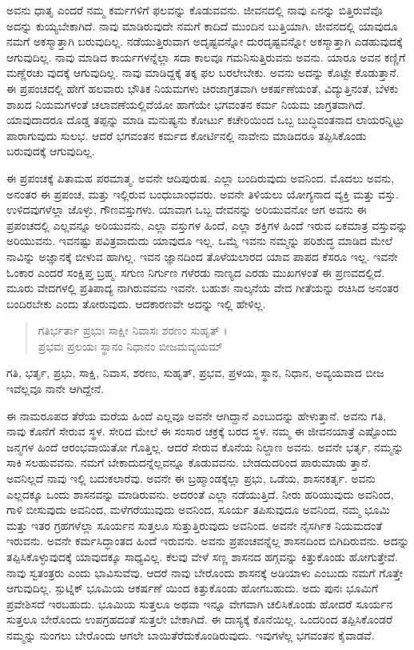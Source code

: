 ಅವನು ಧಾತೃ ಎಂದರೆ ನಮ್ಮ ಕರ್ಮಗಳಿಗೆ ಫಲವನ್ನು ಕೊಡುವವನು. ಜೀವನದಲ್ಲಿ ನಾವು ಏನನ್ನು ಬಿತ್ತಿರುವೆವೊ ಅದನ್ನು ಕುಯ್ಯಬೇಕಾಗಿದೆ. ನಾವು ಮಾಡಿರುವುದೇ ನಮಗೆ ಕಾದಿದೆ ಮುಂದಿನ ಬುತ್ತಿಯಾಗಿ. ಜೀವನದಲ್ಲಿ ಯಾವುದೂ ನಮಗೆ ಅಕಸ್ಮಾತ್ತಾಗಿ ಬರುವುದಿಲ್ಲ. ನಡೆಯುತ್ತಿರುವಾಗ ಅದೃಷ್ಟವನ್ನೋ ದುರದೃಷ್ಟವನ್ನೋ ಅಕಸ್ಮಾತ್ತಾಗಿ ಎಡಹುವುದಕ್ಕೆ ಆಗುವುದಿಲ್ಲ. ನಾವು ಮಾಡಿದ ಕಾರ್ಯಗಳನ್ನೆಲ್ಲಾ ಸದಾ ಕಾಲವೂ ಗಮನಿಸುತ್ತಿರುವನು ಅವನು. ಯಾರೂ ಅವನ ಕಣ್ಣಿಗೆ ಮಣ್ಣೆರಚು ವುದಕ್ಕೆ ಆಗುವುದಿಲ್ಲ. ನಾವು ಮಾಡಿದ್ದಕ್ಕೆ ತಕ್ಕ ಫಲ ಬರಲೇಬೇಕು. ಅವನು ಅದನ್ನು ಕೊಟ್ಟೇ ಕೊಡುತ್ತಾನೆ. ಈ ಪ್ರಪಂಚದಲ್ಲಿ ಹೇಗೆ ಹಲವಾರು ಭೌತಿಕ ನಿಯಮಗಳು ಚಿರಜಾಗ್ರತವಾಗಿ ಆಕರ್ಷಣೆಯಂತೆ, ವಿದ್ಯುತ್ತಿನಂತೆ, ಬೆಳಕು ಶಾಖದ ನಿಯಮಗಳಂತೆ ಚಲಾವಣೆಯಲ್ಲಿವೆಯೋ ಹಾಗೆಯೇ ಭಗವಂತನ ಕರ್ಮ ನಿಯಮ ಜಾಗ್ರತವಾಗಿದೆ. ಯಾವುದಾದರೂ ದೊಡ್ಡ ತಪ್ಪನ್ನು ಮಾಡಿ ಮನುಷ್ಯನು ಕೋರ್ಟು ಕಚೇರಿಯಿಂದ ಒಬ್ಬ ಬುದ್ಧಿವಂತನಾದ ಲಾಯರನ್ನಿಟ್ಟು ಪಾರಾಗುವುದು ಸುಲಭ. ಆದರೆ ಭಗವಂತನ ಕರ್ಮದ ಕೋರ್ಟಿನಲ್ಲಿ ನಾವೇನು ಮಾಡಿದರೂ ತಪ್ಪಿಸಿಕೊಂಡು ಬರುವುದಕ್ಕೆ ಆಗುವುದಿಲ್ಲ.

ಈ ಪ್ರಪಂಚಕ್ಕೆ ಪಿತಾಮಹ ಪರಮಾತ್ಮ. ಅವನೇ ಆದಿಪುರುಷ. ಎಲ್ಲಾ ಬಂದಿರುವುದು ಅವನಿಂದ. ಮೊದಲು ಅವನು, ಅನಂತರ ಈ ಪ್ರಪಂಚ, ಮತ್ತು ಇಲ್ಲಿರುವ ಬಂಧುಬಾಂಧವರು. ಅವನೇ ತಿಳಿಯಲು ಯೋಗ್ಯನಾದ ವ್ಯಕ್ತಿ ಮತ್ತು ವಸ್ತು. ಉಳಿದವುಗಳೆಲ್ಲಾ ಜೊಳ್ಳು, ಗೌಣವಸ್ತುಗಳು. ಯಾವಾಗ ಒಬ್ಬ ದೇವನನ್ನು ಅರಿಯುವನೋ ಆಗ ಅವನು ಈ ಪ್ರಪಂಚದಲ್ಲಿ ಎಲ್ಲವನ್ನೂ ಅರಿಯುವನು, ಎಲ್ಲಾ ವಸ್ತುಗಳ ಹಿಂದೆ, ಎಲ್ಲಾ ಶಕ್ತಿಗಳ ಹಿಂದೆ ಇರುವ ಏಕಮಾತ್ರ ವಸ್ತುವನ್ನು ಅರಿಯುವನು. ಇವನಷ್ಟು ಪವಿತ್ರವಾದುದು ಯಾವುದೂ ಇಲ್ಲ. ಒಮ್ಮೆ ಇವನು ನಮ್ಮನ್ನು ಪರಿಶುದ್ಧ ಮಾಡಿದ ಮೇಲೆ ನಾವಿನ್ನು ಅಜ್ಞಾನಕ್ಕೆ ಬೀಳುವ ಹಾಗಿಲ್ಲ. ಇವನ ಜ್ಞಾನದಿಂದ ತೊಳೆಯಲಾರದ ಯಾವ ಪಾಪದ ಕೆಸರೂ ಇಲ್ಲ. ಇವನೇ ಓಂಕಾರ ಎಂದರೆ ಸಂಕ್ಷಿಪ್ತ ಬ್ರಹ್ಮ. ಸಗುಣ ನಿರ್ಗುಣ ಗಳೆರಡು ನಾಣ್ಯದ ಎರಡು ಮುಖಗಳಂತೆ ಈ ಪ್ರಣವದಲ್ಲಿದೆ. ಮೂರು ವೇದಗಳಲ್ಲಿ ಪ್ರತಿಪಾದ್ಯ ನಾಗಿರುವವನು ಇವನೇ. ಬಹುಶಃ ನಾಲ್ಕನೆಯ ವೇದ ಗೀತೆಯನ್ನು ರಚಿಸಿದ ಅನಂತರ ಬಂದಿರಬೇಕು ಎಂದು ತೋರುವುದು. ಆದಕಾರಣವೇ ಅದನ್ನು ಇಲ್ಲಿ ಹೇಳಿಲ್ಲ.

\begin{verse}
ಗತಿರ್ಭರ್ತಾ ಪ್ರಭುಃ ಸಾಕ್ಷೀ ನಿವಾಸಃ ಶರಣಂ ಸುಹೃತ್ ।\\ಪ್ರಭವಃ ಪ್ರಲಯಃ ಸ್ಥಾನಂ ನಿಧಾನಂ ಬೀಜಮವ್ಯಯಮ್ 
\end{verse}

{\small ಗತಿ, ಭರ್ತೃ, ಪ್ರಭು, ಸಾಕ್ಷಿ, ನಿವಾಸ, ಶರಣು, ಸುಹೃತ್, ಪ್ರಭವ, ಪ್ರಳಯ, ಸ್ಥಾನ, ನಿಧಾನ, ಅವ್ಯಯವಾದ ಬೀಜ ಇವೆಲ್ಲವೂ ನಾನೇ ಆಗಿದ್ದೇನೆ.}

ಈ ನಾಮರೂಪದ ತೆರೆಯ ಮರೆಯ ಹಿಂದೆ ಎಲ್ಲವೂ ಅವನೇ ಆಗಿದ್ದಾನೆ ಎಂಬುದನ್ನು ಹೇಳುತ್ತಾನೆ. ಅವನು ಗತಿ, ನಾವು ಕೊನೆಗೆ ಸೇರುವ ಸ್ಥಳ. ಸೇರಿದ ಮೇಲೆ ಈ ಸಂಸಾರ ಚಕ್ರಕ್ಕೆ ಬರದ ಸ್ಥಳ. ನಮ್ಮ ಈ ಜೀವನಯಾತ್ರೆ ಎಷ್ಟೊಂದು ಜನ್ಮಗಳ ಹಿಂದೆ ಆರಂಭವಾಯಿತೋ ಗೊತ್ತಿಲ್ಲ. ಆದರೆ ಸೇರುವ ಕೊನೆಯ ನಿಲ್ದಾಣ ಅವನು. ಅವನೇ ಭರ್ತೃ, ನಮ್ಮನ್ನು ಸಾಕಿ ಸಲಹುವವನು. ನಮಗೆ ಬೇಕಾದುದನ್ನೆಲ್ಲವನ್ನೂ ಕೊಡುವವನು. ಬೇಡದುದರಿಂದ ಪಾರುಮಾಡು ತ್ತಾನೆ. ಅವನಿಲ್ಲದೆ ನಾವು ಇಲ್ಲಿ ಬದುಕಲಾರೆವು. ಅವನೇ ಈ ಬ್ರಹ್ಮಾಂಡಕ್ಕೆಲ್ಲಾ ಪ್ರಭು, ಒಡೆಯ, ಶಾಸನಕರ್ತೃ. ಅವನು ಎಲ್ಲದಕ್ಕೂ ಒಂದು ಶಾಸನವನ್ನು ಮಾಡಿರುವನು. ಅದರಂತೆ ಎಲ್ಲಾ ನಡೆಯುತ್ತಿದೆ. ನೀರು ಹರಿಯುವುದು ಅವನಿಂದ, ಗಾಳಿ ಬೀಸುವುದು ಅವನಿಂದ, ಮಳೆಗರೆಯುವುದು ಅವನಿಂದ, ಸೂರ್ಯ ತಪಿಸುವುದೂ ಅವನಿಂದ, ನಮ್ಮ ಭೂಮಿ ಮತ್ತು ಇತರ ಗ್ರಹಗಳೆಲ್ಲಾ ಸೂರ್ಯನ ಸುತ್ತಲೂ ಸುತ್ತುತ್ತಿರುವುದು ಅವನಿಂದ. ಅವನೇ ನೈಸರ್ಗಿಕ ನಿಯಮದಂತೆ ಇರುವನು. ಅವನೇ ಕರ್ಮಸಿದ್ಧಾಂತದ ಹಿಂದೆ ಇರುವನು. ಅವನು ಪ್ರಪಂಚವನ್ನೆಲ್ಲ ಶಾಸನದಿಂದ ಬಿಗಿದಿರುವನು. ಅದನ್ನು ತಪ್ಪಿಸಿಕೊಳ್ಳುವುದಕ್ಕೆ ಯಾವುದಕ್ಕೂ ಸಾಧ್ಯವಿಲ್ಲ. ಕೆಲವು ವೇಳೆ ಸಣ್ಣ ಶಾಸನದ ಹಗ್ಗವನ್ನು ಕಿತ್ತುಕೊಂಡು ಹೋಗುತ್ತೇವೆ. ನಾವು ಸ್ವತಂತ್ರರು ಎಂದು ಭಾವಿಸುವೆವು. ಆದರೆ ನಾವು ಬೇರೊಂದು ಶಾಸನಕ್ಕೆ ಅಡಿಯಾಳು ಎಂಬುದು ನಮಗೆ ಗೊತ್ತೇ ಆಗುವುದಿಲ್ಲ. ಸ್ಪುಟ್ನಿಕ್ ಭೂಮಿಯ ಆಕರ್ಷಣೆ ಯಿಂದ ಕಿತ್ತುಕೊಂಡು ಹೋಗಬಹುದು. ಅದು ಪುನಃ ಭೂಮಿಗೆ ಪ್ರವೇಶಿಸದೆ ಇರಬಹುದು. ಭೂಮಿಯ ಸುತ್ತಲೂ ಅಥವಾ ಇನ್ನೂ ವೇಗವಾಗಿ ಚಲಿಸಿಕೊಂಡು ಹೋದರೆ ಸೂರ್ಯನ ಸುತ್ತಲೂ ಬೇರೊಂದು ಉಪಗ್ರಹದಂತೆ ಸುತ್ತಲೇ ಬೇಕಾಗಿದೆ. ಈ ದಾಸ್ಯಕ್ಕೆ ಕೊನೆಯಿಲ್ಲ. ಒಂದರಿಂದ ತಪ್ಪಿಸಿಕೊಂಡರೆ ನಮ್ಮನ್ನು ನುಂಗಲು ಬೇರೊಂದು ಆಗಲೇ ಬಾಯಿತೆರೆದುಕೊಂಡಿರುವುದು. ಇವುಗಳೆಲ್ಲ ಭಗವಂತನ ಕೈವಾಡವೆ.

